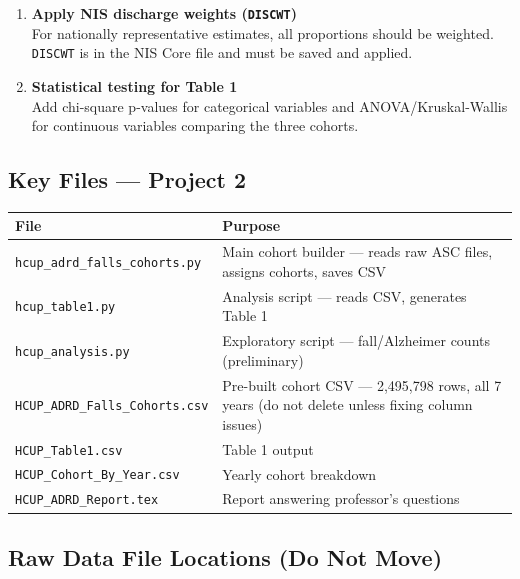 \documentclass[11pt,letterpaper]{article}
\begin{document}
\begin{tcolorbox}[colback=warnred!8, colframe=warnred,
  title=\textbf{Pending Tasks — Project 2}]
\begin{enumerate}[itemsep=6pt]
  \item \textbf{Apply NIS discharge weights (\texttt{DISCWT})} \\
        For nationally representative estimates, all proportions should be weighted.
        \texttt{DISCWT} is in the NIS Core file and must be saved and applied.

  \item \textbf{Statistical testing for Table 1} \\
        Add chi-square p-values for categorical variables and ANOVA/Kruskal-Wallis
        for continuous variables comparing the three cohorts.
\end{enumerate}
\end{tcolorbox}

\subsection{Key Files — Project 2}

\begin{center}
\begin{tabular}{lp{9cm}}
\toprule
\textbf{File} & \textbf{Purpose} \\
\midrule
\texttt{hcup\_adrd\_falls\_cohorts.py} & Main cohort builder — reads raw ASC files,
  assigns cohorts, saves CSV \\
\texttt{hcup\_table1.py}              & Analysis script — reads CSV, generates Table 1 \\
\texttt{hcup\_analysis.py}            & Exploratory script — fall/Alzheimer counts (preliminary) \\
\texttt{HCUP\_ADRD\_Falls\_Cohorts.csv} & Pre-built cohort CSV — 2,495,798 rows,
  all 7 years (do not delete unless fixing column issues) \\
\texttt{HCUP\_Table1.csv}             & Table 1 output \\
\texttt{HCUP\_Cohort\_By\_Year.csv}   & Yearly cohort breakdown \\
\texttt{HCUP\_ADRD\_Report.tex}       & Report answering professor's questions \\
\bottomrule
\end{tabular}
\end{center}

\subsection{Raw Data File Locations (Do Not Move)}
\end{document}
